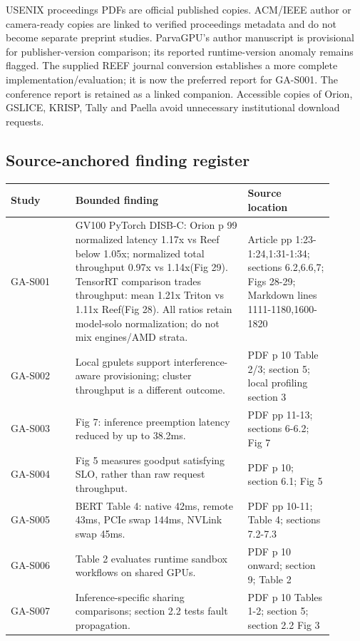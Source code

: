 \documentclass[12pt,a 4paper]{article}
\begin{document}
USENIX proceedings PDFs are official published copies. ACM/IEEE author or camera-ready copies are linked to verified proceedings metadata and do not become separate preprint studies. ParvaGPU's author manuscript is provisional for publisher-version comparison; its reported runtime-version anomaly remains flagged. The supplied REEF journal conversion establishes a more complete implementation/evaluation; it is now the preferred report for GA-S001. The conference report is retained as a linked companion. Accessible copies of Orion, GSLICE, KRISP, Tally and Paella avoid unnecessary institutional download requests.

\subsection{Source-anchored finding register}\begin{longtable}{P{0.18\linewidth}P{0.48\linewidth}P{0.24\linewidth}}\toprule Study & Bounded finding & Source location\\\midrule\endhead
GA-S001 \cite{reef} & GV100 PyTorch DISB-C: Orion p 99 normalized latency 1.17x vs Reef below 1.05x; normalized total throughput 0.97x vs 1.14x(Fig 29). TensorRT comparison trades throughput: mean 1.21x Triton vs 1.11x Reef(Fig 28). All ratios retain model-solo normalization; do not mix engines/AMD strata. & Article pp 1:23-1:24,1:31-1:34; sections 6.2,6.6,7; Figs 28-29; Markdown lines 1111-1180,1600-1820\\
GA-S002 \cite{gpulet} & Local gpulets support interference-aware provisioning; cluster throughput is a different outcome. & PDF p 10 Table 2/3; section 5; local profiling section 3\\
GA-S003 \cite{pipeswitch} & Fig 7: inference preemption latency reduced by up to 38.2ms. & PDF pp 11-13; sections 6-6.2; Fig 7\\
GA-S004 \cite{clockwork} & Fig 5 measures goodput satisfying SLO, rather than raw request throughput. & PDF p 10; section 6.1; Fig 5\\
GA-S005 \cite{torpor} & BERT Table 4: native 42ms, remote 43ms, PCIe swap 144ms, NVLink swap 45ms. & PDF pp 10-11; Table 4; sections 7.2-7.3\\
GA-S006 \cite{streambox} & Table 2 evaluates runtime sandbox workflows on shared GPUs. & PDF p 10 onward; section 9; Table 2\\
GA-S007 \cite{krypton} & Inference-specific sharing comparisons; section 2.2 tests fault propagation. & PDF p 10 Tables 1-2; section 5; section 2.2 Fig 3\\

\end{longtable}
\end{document}
